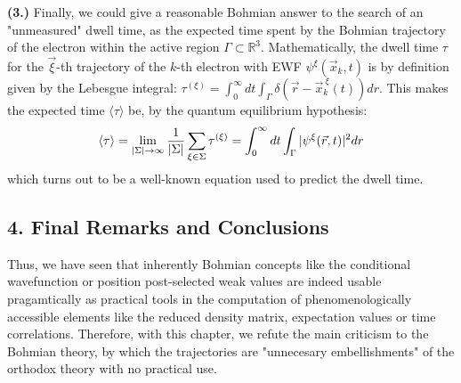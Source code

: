 \documentclass[11pt, a4paper]{article} %
\newcommand{\R}{\mathbb{R}} %
\begin{document}
{\bf (3.) }Finally, we could give a reasonable Bohmian answer to the search of an "unmeasured" dwell time, as the expected time spent by the Bohmian trajectory of the electron within the active region $\Gamma\subset \R^3$. Mathematically, the dwell time $\tau$ for the $\vec{\xi}$-th trajectory of the $k$-th electron with EWF $\psi^\xi(\vec{x}_k,t)$ is by definition given by the Lebesgue integral: $\tau^{( \xi)}= \int_{0}^\infty  dt \int_\Gamma \delta(\vec{r}-\vec{x}_k^{\:\xi}(t)) dr$. This makes the expected time $\langle \tau\rangle$ be, by the quantum equilibrium hypothesis:\vspace{-0.15cm}
\begin{equation}
\langle \tau \rangle = \lim_{|\Sigma|\rightarrow \infty}\frac{1}{|\Sigma|} \sum_{\xi\in\Sigma} \tau^{(\xi)} = \int_{0}^\infty dt \int_\Gamma |\psi^\xi(\vec{r},t)|^2dr\vspace{-0.15cm}
\end{equation}
which turns out to be a well-known equation used to predict the dwell time.\vspace{-0.2cm}


\subsection*{4. Final Remarks and Conclusions}\vspace{-0.15cm}

Thus, we have seen that inherently Bohmian concepts like the conditional wavefunction or position post-selected weak values are indeed usable pragamtically as practical tools in the computation of phenomenologically accessible elements like the reduced density matrix, expectation values or time correlations. Therefore, with this chapter, we refute the main criticism to the Bohmian theory, by which the trajectories are "unnecesary embellishments" of the orthodox theory with no practical use.
\end{document}

